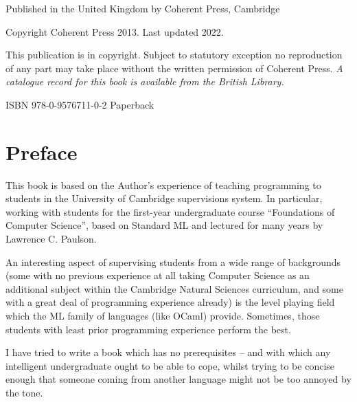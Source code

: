 \documentclass[]{book}
\newcommand{\smspace}{\vspace{4mm}}
\begin{document}
\cleardoublepage %

\thispagestyle{empty}

\vphantom{a}%

\vspace{50mm}

\noindent Published in the United Kingdom by Coherent Press, Cambridge

\vspace{3mm}

\noindent Copyright Coherent Press 2013. Last updated 2022.

\vspace{3mm}

\noindent This publication is in copyright. Subject to statutory exception no reproduction of any part may take place without the written permission of Coherent Press. \textit{A catalogue record for this book is available from the British Library.}

\smspace

\noindent ISBN 978-0-9576711-0-2 Paperback\\



\chapter*{Preface}
This book is based on the Author's experience of teaching programming to students in the University of Cambridge supervisions system. In particular, working with students for the first-year undergraduate course ``Foundations of Computer Science'', based on Standard ML and lectured for many years by Lawrence C. Paulson.

An interesting aspect of supervising students from a wide range of backgrounds (some with no previous experience at all taking Computer Science as an additional subject within the Cambridge Natural Sciences curriculum, and some with a great deal of programming experience already) is the level playing field which the ML family of languages (like OCaml) provide. Sometimes, those students with least prior programming experience perform the best.

I have tried to write a book which has no prerequisites -- and with which any intelligent undergraduate ought to be able to cope, whilst trying to be concise enough that someone coming from another language might not be too annoyed by the tone.
\end{document}
